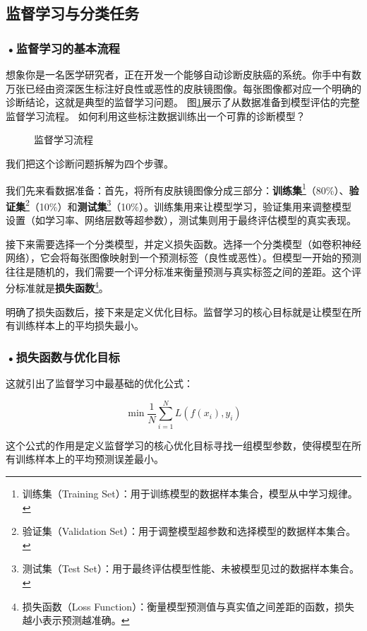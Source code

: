 \subsection{监督学习与分类任务}

\subsubsection*{\textbf{•监督学习的基本流程}}

想象你是一名医学研究者，正在开发一个能够自动诊断皮肤癌的系统。你手中有数万张已经由资深医生标注好良性或恶性的皮肤镜图像。每张图像都对应一个明确的诊断结论，这就是典型的监督学习问题。
图\ref{fig:ch2_2_2}展示了从数据准备到模型评估的完整监督学习流程。
如何利用这些标注数据训练出一个可靠的诊断模型？
\begin{figure}[H]
\centering
{}
\caption{监督学习流程}
\label{fig:ch2_2_2}
\end{figure}


我们把这个诊断问题拆解为四个步骤。

我们先来看数据准备：首先，将所有皮肤镜图像分成三部分：\textbf{训练集}\footnote{训练集（Training Set）：用于训练模型的数据样本集合，模型从中学习规律。}（80\%）、\textbf{验证集}\footnote{验证集（Validation Set）：用于调整模型超参数和选择模型的数据样本集合。}（10\%）和\textbf{测试集}\footnote{测试集（Test Set）：用于最终评估模型性能、未被模型见过的数据样本集合。}（10\%）。训练集用来让模型学习，验证集用来调整模型设置（如学习率、网络层数等超参数），测试集则用于最终评估模型的真实表现。

接下来需要选择一个分类模型，并定义损失函数。选择一个分类模型（如卷积神经网络），它会将每张图像映射到一个预测标签（良性或恶性）。但模型一开始的预测往往是随机的，我们需要一个评分标准来衡量预测与真实标签之间的差距。这个评分标准就是\textbf{损失函数}\footnote{损失函数（Loss Function）：衡量模型预测值与真实值之间差距的函数，损失越小表示预测越准确。}。

明确了损失函数后，接下来是定义优化目标。监督学习的核心目标就是让模型在所有训练样本上的平均损失最小。

\subsubsection*{\textbf{•损失函数与优化目标}}

这就引出了监督学习中最基础的优化公式：

\[
\min \frac{1}{N} \sum_{i=1}^{N} L(f(x_i), y_i)
\]

这个公式的作用是定义监督学习的核心优化目标寻找一组模型参数，使得模型在所有训练样本上的平均预测误差最小。



